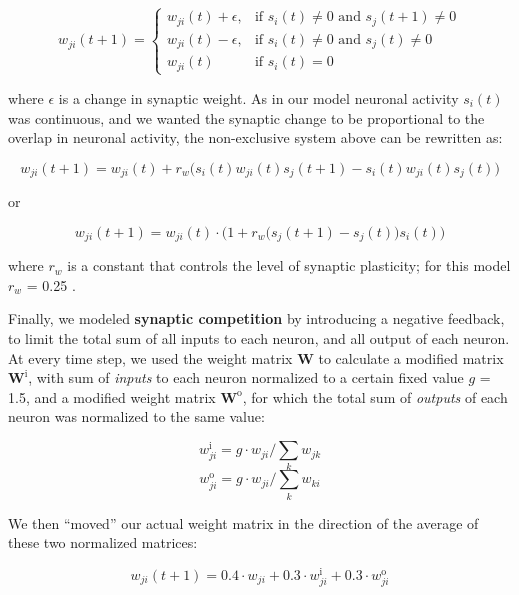 \documentclass{article}
\begin{document}
\[ w_{ji}(t+1) = \left \{ \begin{array}{lll} w_{ji}(t)+\epsilon, & \text{if } s_i(t)\neq 0 \text{ and } s_j(t+1)\neq 0 \\ w_{ji}(t)-\epsilon, & \text{if } s_i(t)\neq 0 \text{ and } s_j(t)\neq 0 \\ w_{ji}(t) & \text{if } s_i(t)=0\end{array} \right. \]

where $\epsilon$ is a change in synaptic weight. As in our model neuronal activity $s_i(t)$ was continuous, and we wanted the synaptic change to be proportional to the overlap in neuronal activity, the non-exclusive system above can be rewritten as:

\[ w_{ji}(t+1) = w_{ji}(t) + r_w \big(s_i(t)w_{ji}(t)s_j(t+1) - s_i(t)w_{ji}(t)s_j(t)\big) \]

or

\[ w_{ji}(t+1) = w_{ji}(t)\cdot\Big(1+r_w\big(s_j(t+1)-s_j(t)\big)s_i(t)\Big) \]

where $r_w$ is a constant that controls the level of synaptic plasticity; for this model $r_w$ = 0.25 .

Finally, we modeled \textbf{synaptic competition} by introducing a negative feedback, to limit the total sum of all inputs to each neuron, and all output of each neuron. At every time step, we used the weight matrix $\textbf{W}$ to calculate a modified matrix $\textbf{W}^\text{i}$, with sum of \textit{inputs} to each neuron normalized to a certain fixed value $g$ = 1.5, and a modified weight matrix $\textbf{W}^\text{o}$, for which the total sum of \textit{outputs} of each neuron was normalized to the same value: 

\[ w_{ji}^\text{i} = g \cdot w_{ji}/\sum_k{w_{jk}} \]
\[ w_{ji}^\text{o} = g \cdot w_{ji}/\sum_k{w_{ki}} \]

We then “moved” our actual weight matrix in the direction of the average of these two normalized matrices:

\[ w_{ji}(t+1) = 0.4 \cdot w_{ji} + 0.3 \cdot w^\text{i}_{ji} + 0.3 \cdot w^\text{o}_{ji} \]
\end{document}
